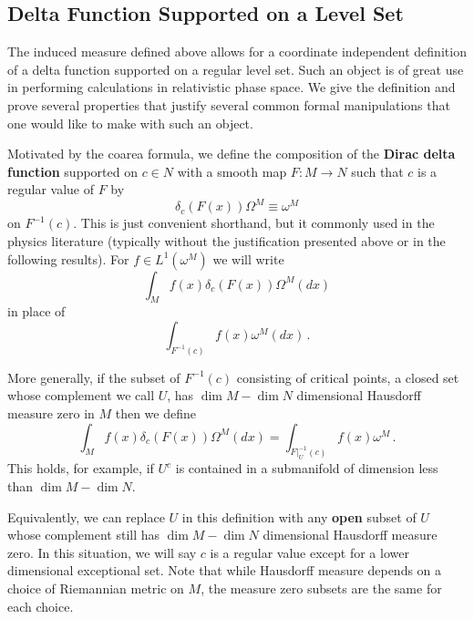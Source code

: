 \subsection{Delta Function Supported on a Level Set}
 The induced measure defined above allows for a coordinate independent definition of a delta function supported on a regular level set.  Such an object is of great use in performing calculations in relativistic phase space.  We give the definition and prove several properties that justify several common formal manipulations that one would like to make with such an object.
\begin{definition}
Motivated by the coarea formula, we define the composition of the {\bf Dirac delta function} supported on $c\in N$ with a smooth map $F:M\rightarrow N$ such that $c$ is a regular value of $F$ by
\begin{equation}\label{delta_def}
 \delta_c(F(x))\Omega^M \equiv \omega^M
\end{equation}
on $F^{-1}(c)$.  This is just convenient shorthand, but it commonly used in the physics literature (typically without the justification presented above or in the following results).   For $f\in L^1(\omega^M)$ we will write 
\begin{equation}
\int_M f(x)\delta_c(F(x))\Omega^M(dx)
\end{equation} 
in place of 
\begin{equation}
\int_{F^{-1}(c)} f(x) \omega^M(dx)\,.
\end{equation}



More generally, if the subset of $F^{-1}(c)$ consisting of critical points, a closed set whose complement we call $U$, has $\dim M-\dim N$ dimensional Hausdorff measure zero in $M$ then we define
\begin{equation}
\int_M f(x)\delta_c(F(x))\Omega^M(dx)=\int_{F|_U^{-1}(c)} f(x)\omega^M\,.
\end{equation}
This holds, for example, if $U^c$ is contained in a submanifold of dimension less than  $\dim M-\dim N$.  

Equivalently, we can replace $U$ in this definition with any {\bf open} subset of $U$ whose complement still has $\dim M-\dim N$ dimensional Hausdorff measure zero. In this situation, we will say $c$ is a regular value except for a lower dimensional exceptional set.  Note that while Hausdorff measure depends on a choice of Riemannian metric on $M$, the measure zero subsets are the same for each choice.
\begin{comment}
Hausdorff measures commutes with restriction to subspaces (w/subspace metric)
Hausdorff measure on a submanifold induced by pullback metric tensor equals that induced by restriction of distance metric from ambient space.
Hausdorff measure of subsets of a manifold being zero is well defined (i.e. ind of choice of metric) so we can define k-dimensional measure zero for any k (integer or not). This follows since vol forms are abs cont wrt hausdorff measure of that dim
\end{comment}
\end{definition}

